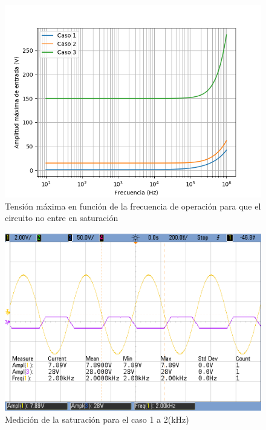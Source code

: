 \begin{figure}[H]
\begin{centering}
\includegraphics[scale=0.5]{../Ex1/iA/Resources1a/sat123}
\par\end{centering}
\begin{centering}
\caption{Tensión máxima en función de la frecuencia de operación para que el
circuito no entre en saturación}
\label{1_a_13_ggg}
\par\end{centering}
\end{figure}

\begin{figure}[H]
\begin{centering}
\includegraphics[scale=0.3]{../Ex1/iA/Resources1a/sat1med}
\par\end{centering}
\begin{centering}
\caption{Medición de la saturación para el caso 1 a 2(kHz)}
\label{1_a_13_asd}
\par\end{centering}
\end{figure}

